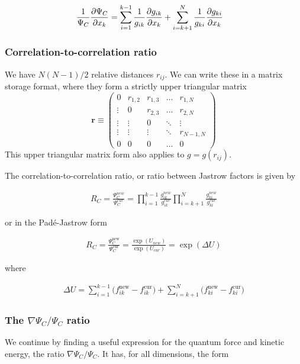 \documentclass[11pt]{article}
\begin{document}
			\begin{align}
				\frac{1}{\Psi_C}\pdv{\Psi_C}{x_k} &= \sum_{i=1}^{k-1}\frac{1}{g_{ik}}\pdv{g_{ik}}{x_k} +  \sum_{i=k+1}^{N}\frac{1}{g_{ki}}\pdv{g_{ki}}{x_k}
			\end{align}

		\subsubsection{Correlation-to-correlation ratio}
			We have $N\left(N-1\right)/2$ relative distances $r_{ij}$. We can
			write these in a matrix storage format, where they form a strictly
			upper triangular matrix
			\[
			\mathbf{r}\equiv\left(\begin{array}{ccccc}
			0 & r_{1,2} & r_{1,3} & \dots & r_{1,N}\\
			\vdots & 0 & r_{2,3} & \dots & r_{2,N}\\
			\vdots & \vdots & 0 & \ddots & \vdots\\
			\vdots & \vdots & \vdots & \ddots & r_{N-1,N}\\
			0 & 0 & 0 & \dots & 0
			\end{array}\right)
			\]
			This upper triangular matrix form also applies to $g=g\left(r_{ij}\right)$.

			The correlation-to-correlation ratio, or ratio between Jastrow factors
			is given by

			\begin{align}
				R_{C}=\frac{\Psi_{C}^{new}}{\Psi_{C}^{cur}}=\prod_{i=1}^{k-1}\frac{g_{ik}^{new}}{g_{ik}^{cur}}\prod_{i=k+1}^{N}\frac{g_{ki}^{new}}{g_{ki}^{cur}}
			\end{align}

			or in the Padé-Jastrow form

			\begin{align}
				R_{C}=\frac{\Psi_{C}^{\mathrm{new}}}{\Psi_{C}^{\mathrm{cur}}}=\frac{\exp\left(U_{new}\right)}{\exp\left(U_{cur}\right)}=\exp\left(\Delta U\right)
			\end{align}

			where

			\begin{align}
				\Delta U =
				\sum_{i=1}^{k-1}\big(f_{ik}^\mathrm{new}-f_{ik}^\mathrm{cur}\big)
				+
				\sum_{i=k+1}^{N}\big(f_{ki}^\mathrm{new}-f_{ki}^\mathrm{cur}\big)
			\end{align}

		\subsubsection{The $\nabla \Psi_{C}/\Psi_{C}$ ratio}
			We continue by finding a useful expression for the quantum force and kinetic energy, the ratio $\nabla\Psi_{C}/\Psi_{C}$. It has,
			for all dimensions, the form
\end{document}
